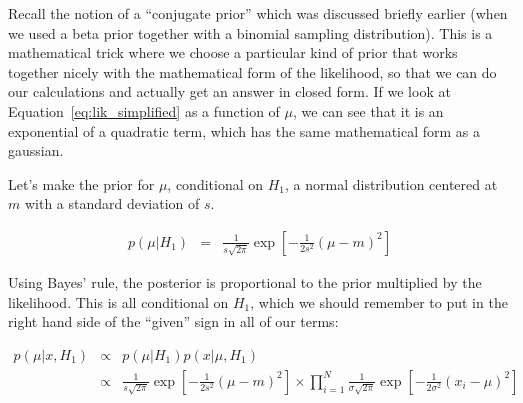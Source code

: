 Recall the notion of a ``conjugate prior'' which was discussed briefly earlier
(when we used a beta prior together with a binomial sampling distribution).
This is a mathematical trick where we choose a particular kind of prior
that works together nicely with the mathematical form of the likelihood, so
that we can do our calculations and actually get an answer in closed form.
If we look at Equation~\ref{eq:lik_simplified} as a function of $\mu$, we
can see that it is an exponential of a quadratic term, which has the same
mathematical form as a gaussian.

Let's make the prior for $\mu$, conditional on $H_1$, a normal distribution
centered at $m$ with a standard deviation of $s$.

\begin{eqnarray}
p(\mu | H_1) &=& \frac{1}{s\sqrt{2\pi}}\exp
\left[-\frac{1}{2s^2}\left(\mu - m\right)^2\right]
\end{eqnarray}

Using Bayes' rule, the posterior is proportional to the prior multiplied by
the likelihood. This is all conditional on $H_1$, which we should remember
to put in the right hand side of the ``given'' sign in all of our terms:

\begin{eqnarray}
p(\mu | x, H_1) &\propto& p(\mu | H_1)p(x | \mu, H_1) \\
&\propto&
\frac{1}{s\sqrt{2\pi}}\exp
\left[-\frac{1}{2s^2}\left(\mu - m\right)^2\right]
\times
\prod_{i=1}^N \frac{1}{\sigma\sqrt{2\pi}}
\exp
\left[-\frac{1}{2\sigma^2}\left(x_i - \mu\right)^2\right]
\end{eqnarray}

